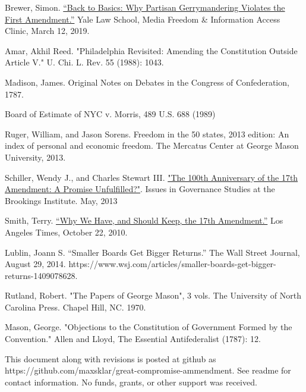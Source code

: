 \documentclass{article}
\begin{document}
\begin{thebibliography}{20}
Brewer, Simon. \href{https://law.yale.edu/mfia/case-disclosed/back-basics-why-partisan-gerrymandering-violates-first-amendment. }{“Back to Basics: Why Partisan Gerrymandering Violates the First Amendment.”} Yale Law School, Media Freedom \& Information Access Clinic, March 12, 2019.

Amar, Akhil Reed. "Philadelphia Revisited: Amending the Constitution Outside Article V." U. Chi. L. Rev. 55 (1988): 1043.

Madison, James. Original Notes on Debates in the Congress of Confederation, 1787.

Board of Estimate of NYC v. Morris, 489 U.S. 688 (1989)

Ruger, William, and Jason Sorens. Freedom in the 50 states, 2013 edition: An index of personal and economic freedom. The Mercatus Center at George Mason University, 2013.

Schiller, Wendy J., and Charles Stewart III. \href{https://www.brookings.edu/wp-content/uploads/2016/06/Schiller_17th-Amendment_v7.pdf}{"The 100th Anniversary of the 17th Amendment: A Promise Unfulfilled?"}. Issues in Governance Studies at the Brookings Institute. May, 2013

Smith, Terry. \href{https://www.latimes.com/archives/la-xpm-2010-oct-22-la-oew-smith-17th-amendment-20101022-story.html}{“Why We Have, and Should Keep, the 17th Amendment.”} Los Angeles Times, October 22, 2010.

Lublin, Joann S. “Smaller Boards Get Bigger Returns.” The Wall Street Journal, August 29, 2014. https://www.wsj.com/articles/smaller-boards-get-bigger-returns-1409078628. 

Rutland, Robert. "The Papers of George Mason", 3 vols. The University of North Carolina Press. Chapel Hill, NC. 1970.

Mason, George. "Objections to the Constitution of Government Formed by the Convention." Allen and Lloyd, The Essential Antifederalist (1787): 12.

\end{thebibliography}

This document along with revisions is posted at github as https://github.com/maxsklar/great-compromise-ammendment. See readme for contact information. No funds, grants, or other support was received.
\end{document}
